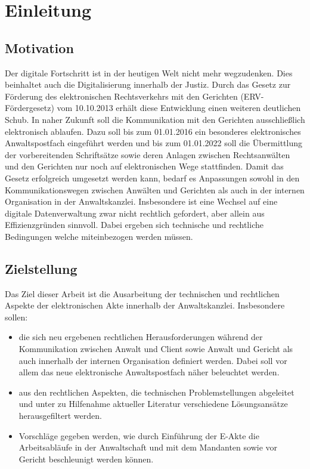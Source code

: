 \section{Einleitung}

\subsection*{Motivation}
Der digitale Fortschritt ist in der heutigen Welt nicht mehr wegzudenken. Dies beinhaltet auch die Digitalisierung innerhalb der Justiz. Durch das Gesetz zur Förderung des elektronischen Rechtsverkehrs mit den Gerichten (ERV-Fördergesetz) vom 10.10.2013 erhält diese Entwicklung einen weiteren deutlichen Schub. In naher Zukunft soll die Kommunikation mit den Gerichten ausschließlich elektronisch ablaufen. Dazu soll bis zum 01.01.2016 ein besonderes elektronisches Anwaltspostfach eingeführt werden und bis zum 01.01.2022 soll die Übermittlung der vorbereitenden Schriftsätze sowie deren Anlagen zwischen Rechtsanwälten und den Gerichten nur noch auf elektronischen Wege stattfinden. 
Damit das Gesetz erfolgreich umgesetzt werden kann, bedarf es Anpassungen sowohl in den Kommunikationswegen zwischen Anwälten und Gerichten als auch in der internen Organisation in der Anwaltskanzlei. Insbesondere ist eine Wechsel auf eine digitale Datenverwaltung zwar nicht rechtlich gefordert, aber allein aus Effizienzgründen sinnvoll. Dabei ergeben sich technische und rechtliche Bedingungen welche miteinbezogen werden müssen.  

\subsection*{Zielstellung}
Das Ziel dieser Arbeit ist die Ausarbeitung der technischen und rechtlichen Aspekte der elektronischen Akte innerhalb der Anwaltskanzlei. Insbesondere sollen:
\begin{itemize}
\item die sich neu ergebenen rechtlichen Herausforderungen während der Kommunikation zwischen Anwalt und Client sowie Anwalt und Gericht als auch innerhalb der internen Organisation definiert werden.  Dabei soll vor allem das neue elektronische Anwaltspostfach näher beleuchtet werden.
\item aus den rechtlichen Aspekten, die technischen Problemstellungen abgeleitet und unter zu Hilfenahme aktueller Literatur verschiedene Lösungsansätze herausgefiltert werden.
\item  Vorschläge gegeben werden, wie durch Einführung der E-Akte die Arbeitsabläufe in der Anwaltschaft und mit dem Mandanten sowie vor Gericht beschleunigt werden können.
\end{itemize} 
